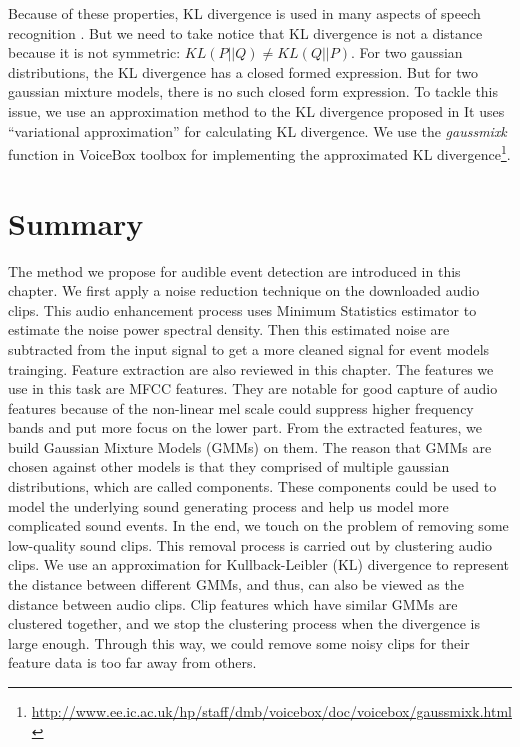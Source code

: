 Because of these properties, KL divergence is used in many aspects of speech recognition \cite{olsen2003efficient}. 
But we need to take notice that KL divergence is not a distance because it is not symmetric: $KL(P||Q) \neq KL(Q||P)$. 
For two gaussian distributions, the KL divergence has a closed formed expression. 
But for two gaussian mixture models, there is no such closed form expression. 
To tackle this issue, we use an approximation method to the KL divergence proposed in \cite{hershey2007approximating}
It uses ``variational approximation'' for calculating KL divergence. 
We use the \textit{gaussmixk} function in VoiceBox toolbox for implementing the approximated KL divergence\footnote{\url{http://www.ee.ic.ac.uk/hp/staff/dmb/voicebox/doc/voicebox/gaussmixk.html}}. 

\section{Summary}
The method we propose for audible event detection are introduced in this chapter. 
We first apply a noise reduction technique on the downloaded audio clips. 
This audio enhancement process uses Minimum Statistics estimator to estimate the noise power spectral density. 
Then this estimated noise are subtracted from the input signal to get a more cleaned signal for event models trainging. 
Feature extraction are also reviewed in this chapter.  
The features we use in this task are MFCC features. 
They are notable for good capture of audio features because of the non-linear mel scale could suppress higher frequency bands and put more focus on the lower part. 
From the extracted features, we build Gaussian Mixture Models (GMMs) on them. 
The reason that GMMs are chosen against other models is that they comprised of multiple gaussian distributions, which are called components. 
These components could be used to model the underlying sound generating process and help us model more complicated sound events. 
In the end, we touch on the problem of removing some low-quality sound clips. 
This removal process is carried out by clustering audio clips. 
We use an approximation for Kullback-Leibler (KL) divergence to represent the distance between different GMMs, and thus, can also be viewed as the distance between audio clips. 
Clip features which have similar GMMs are clustered together, and we stop the clustering process when the divergence is large enough. 
Through this way, we could remove some noisy clips for their feature data is too far away from others. 
